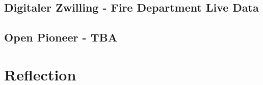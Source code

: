 \documentclass[11pt, titlepage, a4paper]{article}
\begin{document}
\subsection{Digitaler Zwilling - Fire Department Live Data}
\subsection{Open Pioneer - TBA}
\section{Reflection}

\clearpage
\printglossary[type=\acronymtype]
\printglossary
\clearpage
\printbibliography
\end{document}
